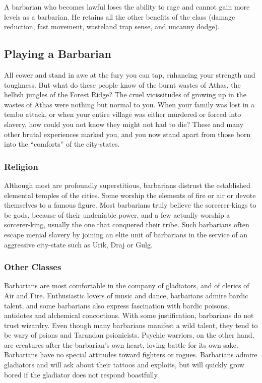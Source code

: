 A barbarian who becomes lawful loses the ability to rage and cannot gain more levels as a barbarian. He retains all the other benefits of the class (damage reduction, fast movement, wasteland trap sense, and uncanny dodge).

\subsection{Playing a Barbarian}

All cower and stand in awe at the fury you can tap, enhancing your strength and toughness. But what do these people know of the burnt wastes of Athas, the hellish jungles of the Forest Ridge? The cruel vicissitudes of growing up in the wastes of Athas were nothing but normal to you. When your family was lost in a tembo attack, or when your entire village was either murdered or forced into slavery, how could you not know they might not had to die? These and many other brutal experiences marked you, and you now stand apart from those born into the “comforts” of the city‐states.

\subsubsection{Religion}

Although most are profoundly superstitious, barbarians distrust the established elemental temples of the cities. Some worship the elements of fire or air or devote themselves to a famous figure. Most barbarians truly believe the sorcerer‐kings to be gods, because of their undeniable power, and a few actually worship a sorcerer‐king, usually the one that conquered their tribe. Such barbarians often escape menial slavery by joining an elite unit of barbarians in the service of an aggressive city‐state such as Urik, Draj or Gulg.

\subsubsection{Other Classes}

Barbarians are most comfortable in the company of gladiators, and of clerics of Air and Fire. Enthusiastic lovers of music and dance, barbarians admire bardic talent, and some barbarians also express fascination with bardic poisons, antidotes and alchemical concoctions. With some justification, barbarians do not trust wizardry. Even though many barbarians manifest a wild talent, they tend to be wary of psions and Tarandan psionicists. Psychic warriors, on the other hand, are creatures after the barbarian's own heart, loving battle for its own sake. Barbarians have no special attitudes toward fighters or rogues. Barbarians admire gladiators and will ask about their tattoos and exploits, but will quickly grow bored if the gladiator does not respond boastfully.

